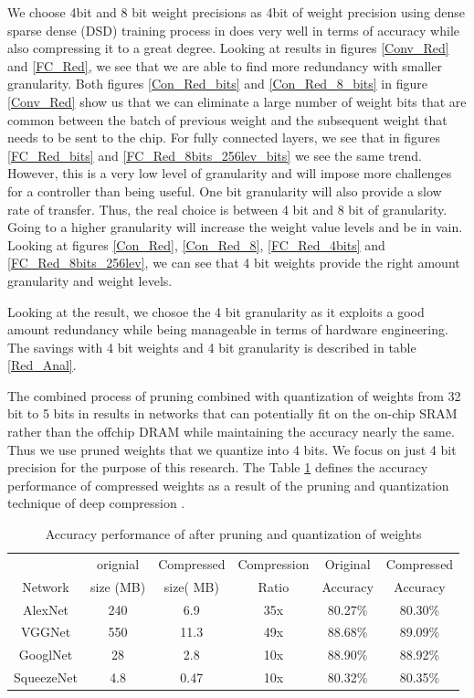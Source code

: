 \documentclass[conference]{IEEEtran}
\begin{document}
We choose 4bit and 8 bit weight precisions as 4bit of weight precision using dense sparse dense (DSD) training process in \cite{han2016dsd} does very well in terms of accuracy while also compressing it to a great degree. Looking at results in figures \ref{Conv_Red} and \ref{FC_Red}, we see that 
we are able to find more redundancy with smaller granularity. Both figures \ref{Con_Red_bits} and \ref{Con_Red_8_bits} in figure \ref{Conv_Red} show us that we can eliminate a large number of weight bits that are common between the batch of previous weight and the subsequent weight that needs to be sent to the chip. For fully connected layers, we see that in figures \ref{FC_Red_bits} and  \ref{FC_Red_8bits_256lev_bits} we see the same trend. However, this is a very low level of granularity and will impose more challenges for a controller than being useful. One bit granularity will also provide a slow rate of transfer. Thus, the real choice is between 4 bit and 8 bit of granularity. Going to a higher granularity will increase the weight value levels and be in vain. Looking at figures \ref{Con_Red}, \ref{Con_Red_8}, \ref{FC_Red_4bits} and \ref{FC_Red_8bits_256lev}, we can see that 4 bit weights provide the right amount granularity and weight levels. 

Looking at the result, we chosoe the 4 bit granularity as it exploits a good amount redundancy while being manageable in terms of hardware engineering. The savings with 4 bit weights and 4 bit granularity is described in table \ref{Red_Anal}.

\color{red}
The combined process of pruning combined with quantization of weights from 32 bit to 5 bits in \cite{han2015deep} results in networks that can potentially fit on the on-chip SRAM rather than the offchip DRAM while maintaining the accuracy nearly the same. Thus we use pruned weights that we quantize into 4 bits. We focus on just 4 bit precision for the purpose of this research. The Table \ref{comp_acc} defines the accuracy performance of compressed weights as a result of the pruning  and quantization technique of deep compression \cite{han2015deep}.

\begin{table}[!h]
\centering
\caption{Accuracy performance of after pruning and quantization of weights \cite{hand2015deep}}
\begin{tabular}{cccccc}
\hline
			& orignial & Compressed & Compression & Original & Compressed \\
Network    & size (MB)& size( MB)   & Ratio & Accuracy & Accuracy   \\ \hline
AlexNet    & 240           & 6.9             & 35x               & 80.27\%  & 80.30\%    \\
VGGNet     & 550           & 11.3            & 49x               & 88.68\%  & 89.09\%    \\
GooglNet   & 28            & 2.8             & 10x               & 88.90\%  & 88.92\%    \\
SqueezeNet & 4.8           & 0.47            & 10x               & 80.32\%  & 80.35\%    \\ \hline
\end{tabular}
\label{comp_acc}
\end{table}
\end{document}
